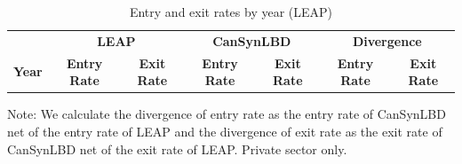 \begin{table}[H]
  \centering
\begin{threeparttable}
 \caption{Entry and exit rates by year (LEAP)} \label{tab:Can:FirmDynamics} \medskip
\renewcommand{\arraystretch}{1}
\begin{tabular}{l|c c| c c| c c}
\toprule
&\multicolumn{2}{c|}{\textbf{LEAP}} &  \multicolumn{2}{c|}{\textbf{CanSynLBD}}&  \multicolumn{2}{c}{\textbf{Divergence}}\\
\textbf{Year}&\textbf{Entry Rate}&\textbf{Exit Rate}&\textbf{Entry Rate}&\textbf{Exit Rate} &\textbf{Entry Rate}&\textbf{Exit Rate}\\
\midrule

   \bottomrule
  \end{tabular} 
\begin{tablenotes}
\small
\item Note: \CanTableNote  We calculate the divergence of entry rate as the entry rate of CanSynLBD net of the entry rate of LEAP and the divergence of exit rate as the exit rate of CanSynLBD net of the exit rate of LEAP. Private sector only.
 \end{tablenotes}
 \end{threeparttable}
\end{table}

